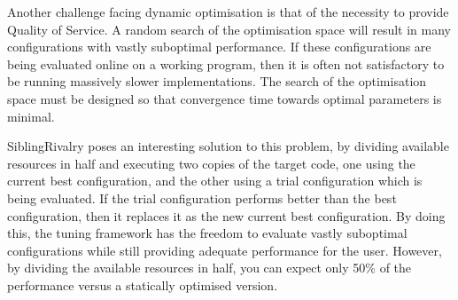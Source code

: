Another challenge facing dynamic optimisation is that of the necessity
to provide Quality of Service. A random search of the optimisation
space will result in many configurations with vastly suboptimal
performance. If these configurations are being evaluated online on a
working program, then it is often not satisfactory to be running
massively slower implementations. The search of the optimisation space
must be designed so that convergence time towards optimal parameters
is minimal.

SiblingRivalry poses an interesting solution to this problem, by
dividing available resources in half and executing two copies of the
target code, one using the current best configuration, and the other
using a trial configuration which is being evaluated. If the trial
configuration performs better than the best configuration, then it
replaces it as the new current best configuration. By doing this, the
tuning framework has the freedom to evaluate vastly suboptimal
configurations while still providing adequate performance for the
user. However, by dividing the available resources in half, you can
expect only 50\% of the performance versus a statically optimised
version.


